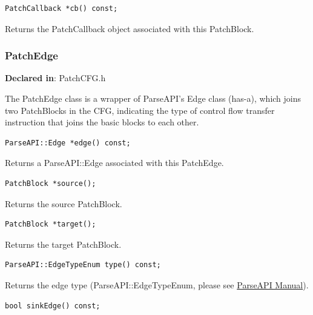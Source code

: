 \documentclass[11pt]{article}
\begin{document}
\begin{verbatim}
PatchCallback *cb() const;

\end{verbatim}



Returns the PatchCallback object associated with this PatchBlock.

\subsubsection{PatchEdge}
\label{sec-3.2.11}

\textbf{Declared in}: PatchCFG.h

The PatchEdge class is a wrapper of ParseAPI's Edge class (has-a), which joins
two PatchBlocks in the CFG, indicating the type of control flow transfer
instruction that joins the basic blocks to each other.


\begin{verbatim}
ParseAPI::Edge *edge() const;

\end{verbatim}



Returns a ParseAPI::Edge associated with this PatchEdge.


\begin{verbatim}
PatchBlock *source();

\end{verbatim}



Returns the source PatchBlock.


\begin{verbatim}
PatchBlock *target();

\end{verbatim}



Returns the target PatchBlock.


\begin{verbatim}
ParseAPI::EdgeTypeEnum type() const;

\end{verbatim}



Returns the edge type (ParseAPI::EdgeTypeEnum, please see \href{ftp://ftp.cs.wisc.edu/paradyn/releases/release7.0/doc/parseapi.pdf}{ParseAPI Manual}).


\begin{verbatim}
bool sinkEdge() const;

\end{verbatim}
\end{document}
